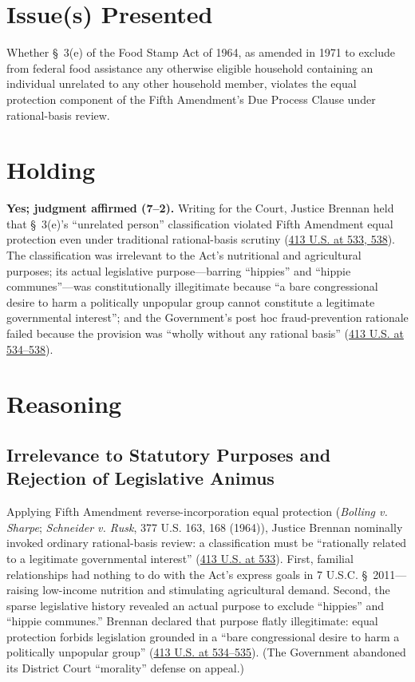 \documentclass[12pt]{article}
\begin{document}
\section{Issue(s) Presented}

Whether \S~3(e) of the Food Stamp Act of 1964, as amended in 1971 to exclude from federal food assistance any otherwise eligible household containing an individual unrelated to any other household member, violates the equal protection component of the Fifth Amendment's Due Process Clause under rational-basis review.

\section{Holding}

\textbf{Yes; judgment affirmed (7--2).} Writing for the Court, Justice Brennan held that \S~3(e)'s ``unrelated person'' classification violated Fifth Amendment equal protection even under traditional rational-basis scrutiny (\href{https://supreme.justia.com/cases/federal/us/413/528/}{413 U.S. at 533, 538}). The classification was irrelevant to the Act's nutritional and agricultural purposes; its actual legislative purpose---barring ``hippies'' and ``hippie communes''---was constitutionally illegitimate because ``a bare congressional desire to harm a politically unpopular group cannot constitute a legitimate governmental interest''; and the Government's post hoc fraud-prevention rationale failed because the provision was ``wholly without any rational basis'' (\href{https://supreme.justia.com/cases/federal/us/413/528/}{413 U.S. at 534--538}).

\section{Reasoning}

\subsection{Irrelevance to Statutory Purposes and Rejection of Legislative Animus}

Applying Fifth Amendment reverse-incorporation equal protection (\textit{Bolling v. Sharpe}; \textit{Schneider v. Rusk}, 377 U.S. 163, 168 (1964)), Justice Brennan nominally invoked ordinary rational-basis review: a classification must be ``rationally related to a legitimate governmental interest'' (\href{https://supreme.justia.com/cases/federal/us/413/528/}{413 U.S. at 533}). First, familial relationships had nothing to do with the Act's express goals in 7 U.S.C. \S~2011---raising low-income nutrition and stimulating agricultural demand. Second, the sparse legislative history revealed an actual purpose to exclude ``hippies'' and ``hippie communes.'' Brennan declared that purpose flatly illegitimate: equal protection forbids legislation grounded in a ``bare congressional desire to harm a politically unpopular group'' (\href{https://supreme.justia.com/cases/federal/us/413/528/}{413 U.S. at 534--535}). (The Government abandoned its District Court ``morality'' defense on appeal.)
\end{document}
